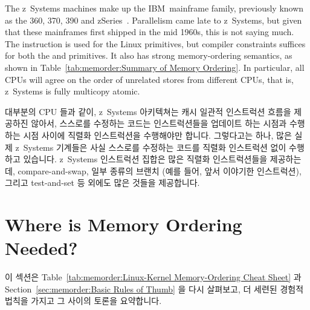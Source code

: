 The z~Systems machines make up the IBM\mytexttrademark\
mainframe family, previously
known as the 360, 370, 390 and zSeries~\cite{IBMzSeries04a}.
Parallelism came late to z~Systems, but given that these mainframes first
shipped in the mid 1960s, this is not saying much.
The  instruction is used for the Linux  primitives,
but compiler constraints suffices for both the
 and  primitives.
It also has strong memory-ordering semantics, as shown in
Table~\ref{tab:memorder:Summary of Memory Ordering}.
In particular, all CPUs
will agree on the order of unrelated stores from different CPUs,
that is, z~Systems is fully multicopy atomic.
\fi

대부분의 CPU 들과 같이, z~Systems 아키텍쳐는 캐시 일관적 인스트럭션 흐름을
제공하진 않아서, 스스로를 수정하는 코드는 인스트럭션들을 업데이트 하는 시점과
수행하는 시점 사이에 직렬화 인스트럭션을 수행해야만 합니다.
그렇다고는 하나, 많은 실제 z~Systems 기계들은 사실 스스로를 수정하는 코드를
직렬화 인스트럭션 없이 수행하고 있습니다.
z~Systems 인스트럭션 집합은 많은 직렬화 인스트럭션들을 제공하는데,
compare-and-swap, 일부 종류의 브랜치 (예를 들어, 앞서 이야기한 
인스트럭션), 그리고 test-and-set 등 외에도 많은 것들을 제공합니다.

\section{Where is Memory Ordering Needed?}
\label{sec:memorder:Where is Memory Ordering Needed?}

이 섹션은
Table~\ref{tab:memorder:Linux-Kernel Memory-Ordering Cheat Sheet} 과
Section~\ref{sec:memorder:Basic Rules of Thumb} 을 다시 살펴보고, 더 세련된
경험적 법칙을 가지고 그 사이의 토론을 요약합니다.


